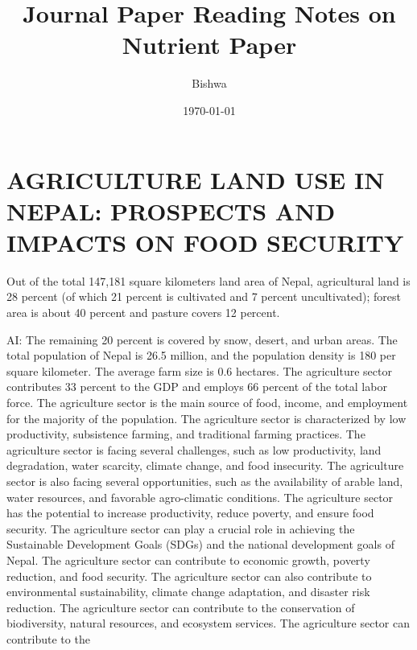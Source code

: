 \documentclass[a4paper,12pt]{article}
\title{Journal Paper Reading Notes on Nutrient Paper}
\author{Bishwa}
\date{\today}
\begin{document}
\maketitle



\section{AGRICULTURE LAND USE IN NEPAL: PROSPECTS AND IMPACTS ON FOOD SECURITY}
\parencite{timilsinaAGRICULTURELANDUSE2019}
Out of the total 147,181 square kilometers land area of Nepal, agricultural land is 28 percent (of which 21 percent is cultivated and 7 percent uncultivated); forest area is about 40 percent and pasture covers 12 percent.

AI: The remaining 20 percent is covered by snow, desert, and urban areas. The total population of Nepal is 26.5 million, and the population density is 180 per square kilometer. The average farm size is 0.6 hectares. The agriculture sector contributes 33 percent to the GDP and employs 66 percent of the total labor force. The agriculture sector is the main source of food, income, and employment for the majority of the population. The agriculture sector is characterized by low productivity, subsistence farming, and traditional farming practices. The agriculture sector is facing several challenges, such as low productivity, land degradation, water scarcity, climate change, and food insecurity. The agriculture sector is also facing several opportunities, such as the availability of arable land, water resources, and favorable agro-climatic conditions. The agriculture sector has the potential to increase productivity, reduce poverty, and ensure food security. The agriculture sector can play a crucial role in achieving the Sustainable Development Goals (SDGs) and the national development goals of Nepal. The agriculture sector can contribute to economic growth, poverty reduction, and food security. The agriculture sector can also contribute to environmental sustainability, climate change adaptation, and disaster risk reduction. The agriculture sector can contribute to the conservation of biodiversity, natural resources, and ecosystem services. The agriculture sector can contribute to the
\end{document}
